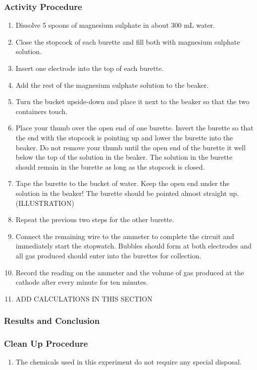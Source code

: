 \subsubsection*{Activity Procedure}
\begin{enumerate}
\item{Dissolve 5 spoons of magnesium sulphate in about 300 mL water.}
\item{Close the stopcock of each burette and fill both with magnesium sulphate solution.}
\item{Insert one electrode into the top of each burette.}
\item{Add the rest of the magnesium sulphate solution to the beaker.}
\item{Turn the bucket upside-down and place it next to the beaker so that the two containers touch.}
\item{Place your thumb over the open end of one burette. Invert the burette so that the end with the stopcock is pointing up and lower the burette into the beaker. Do not remove your thumb until the open end of the burette it well below the top of the solution in the beaker. The solution in the burette should remain in the burette as long as the stopcock is closed.}
\item{Tape the burette to the bucket of water. Keep the open end under the solution in the beaker! The burette should be pointed almost straight up. (ILLUSTRATION)}
\item{Repeat the previous two steps for the other burette.}
\item{Connect the remaining wire to the ammeter to complete the circuit and immediately start the stopwatch. Bubbles should form at both electrodes and all gas produced should enter into the burettes for collection.}
\item{Record the reading on the ammeter and the volume of gas produced at the cathode after every minute for ten minutes.}
\item{ADD CALCULATIONS IN THIS SECTION}
\end{enumerate}

\subsubsection*{Results and Conclusion}

\subsubsection*{Clean Up Procedure}
\begin{enumerate}
\item{The chemicals used in this experiment do not require any special disposal.}
\end{enumerate}

